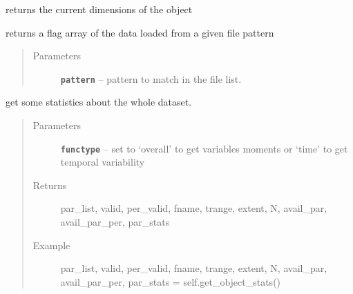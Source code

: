 \documentclass[letterpaper,10pt,english]{sphinxmanual}
\begin{document}
\begin{fulllineitems}
\begin{fulllineitems}
\end{fulllineitems}


\begin{fulllineitems}
\label{altimetry.data:altimetry.data.hydro_data.get_currentDim}
returns the current dimensions of the object

\end{fulllineitems}


\begin{fulllineitems}
\label{altimetry.data:altimetry.data.hydro_data.get_file}
returns a flag array of the data loaded from a given file pattern
\begin{quote}\begin{description}
\item[{Parameters}] \leavevmode
\textbf{\texttt{pattern}} -- pattern to match in the file list.

\end{description}\end{quote}

\end{fulllineitems}


\begin{fulllineitems}
\label{altimetry.data:altimetry.data.hydro_data.get_object_stats}
get some statistics about the whole dataset.
\begin{quote}\begin{description}
\item[{Parameters}] \leavevmode
\textbf{\texttt{functype}} -- set to `overall' to get variables moments or `time' to get temporal variability

\item[{Returns}] \leavevmode
par\_list, valid, per\_valid, fname, trange, extent, N, avail\_par, avail\_par\_per, par\_stats

\item[{Example}] \leavevmode
par\_list, valid, per\_valid, fname, trange, extent, N, avail\_par, avail\_par\_per, par\_stats = self.get\_object\_stats()


\end{description}
\end{quote}
\end{fulllineitems}
\end{fulllineitems}
\end{document}
